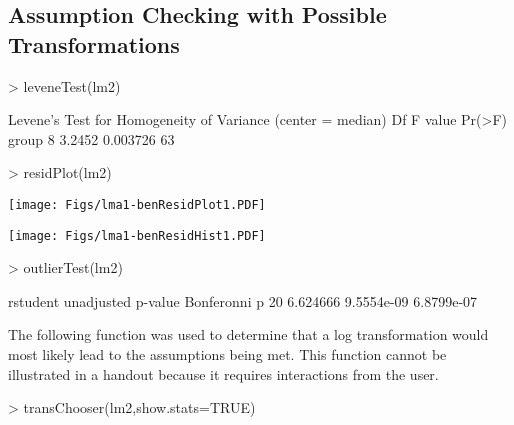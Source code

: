 \documentclass[a4paper]{article}
\begin{document}
\subsection{Assumption Checking with Possible Transformations}

\begin{Schunk}
\begin{Sinput}
> leveneTest(lm2)
\end{Sinput}
\begin{Soutput}
Levene's Test for Homogeneity of Variance (center = median)
      Df F value   Pr(>F)
group  8  3.2452 0.003726
      63                 
\end{Soutput}
\begin{Sinput}
> residPlot(lm2)
\end{Sinput}
\end{Schunk}

\texttt{[image: Figs/lma1-benResidPlot1.PDF]}

\begin{Schunk}
\end{Schunk}

\texttt{[image: Figs/lma1-benResidHist1.PDF]}

\begin{Schunk}
\begin{Sinput}
> outlierTest(lm2)
\end{Sinput}
\begin{Soutput}
   rstudent unadjusted p-value Bonferonni p
20 6.624666         9.5554e-09   6.8799e-07
\end{Soutput}
\end{Schunk}

The following function was used to determine that a log transformation would most likely lead to the assumptions being met.  This function cannot be illustrated in a handout because it requires interactions from the user.
\begin{Schunk}
\begin{Sinput}
> transChooser(lm2,show.stats=TRUE)
\end{Sinput}
\end{Schunk}
\vspace{-18pt}
\end{document}
